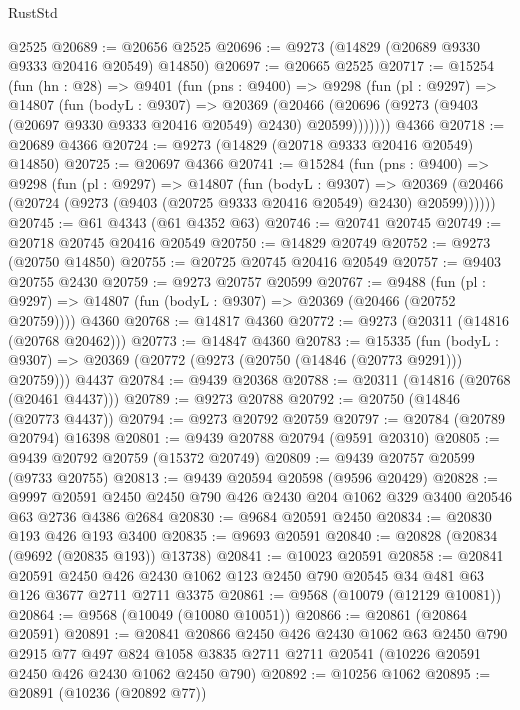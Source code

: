 \begin{lexlean}{RustStd}
\begin{coremodule}
{\begin{coremodule}
{{{{{{{{{{{{{{{{{{{{{{{{{{{{{{{{{{{{{{{{{{{{{{{{{{{{{{{    @2525
@20689 := @20656 @2525
@20696 := @9273 (@14829 (@20689 @9330 @9333 @20416 @20549) @14850)
@20697 := @20665 @2525
@20717 := @15254
    (fun (hn : @28) =>
    @9401
      (fun (pns : @9400) =>
      @9298
        (fun (pl : @9297) =>
        @14807
          (fun (bodyL : @9307) =>
          @20369
            (@20466 (@20696 (@9273 (@9403 (@20697 @9330 @9333 @20416 @20549) @2430) @20599)))))))
    @4366
@20718 := @20689 @4366
@20724 := @9273 (@14829 (@20718 @9333 @20416 @20549) @14850)
@20725 := @20697 @4366
@20741 := @15284
    (fun (pns : @9400) =>
    @9298
      (fun (pl : @9297) =>
      @14807
        (fun (bodyL : @9307) =>
        @20369 (@20466 (@20724 (@9273 (@9403 (@20725 @9333 @20416 @20549) @2430) @20599))))))
@20745 := @61 @4343 (@61 @4352 @63)
@20746 := @20741 @20745
@20749 := @20718 @20745 @20416 @20549
@20750 := @14829 @20749
@20752 := @9273 (@20750 @14850)
@20755 := @20725 @20745 @20416 @20549
@20757 := @9403 @20755 @2430
@20759 := @9273 @20757 @20599
@20767 := @9488
    (fun (pl : @9297) => @14807 (fun (bodyL : @9307) => @20369 (@20466 (@20752 @20759))))
    @4360
@20768 := @14817 @4360
@20772 := @9273 (@20311 (@14816 (@20768 @20462)))
@20773 := @14847 @4360
@20783 := @15335
    (fun (bodyL : @9307) => @20369 (@20772 (@9273 (@20750 (@14846 (@20773 @9291))) @20759)))
    @4437
@20784 := @9439 @20368
@20788 := @20311 (@14816 (@20768 (@20461 @4437)))
@20789 := @9273 @20788
@20792 := @20750 (@14846 (@20773 @4437))
@20794 := @9273 @20792 @20759
@20797 := @20784 (@20789 @20794) @16398
@20801 := @9439 @20788 @20794 (@9591 @20310)
@20805 := @9439 @20792 @20759 (@15372 @20749)
@20809 := @9439 @20757 @20599 (@9733 @20755)
@20813 := @9439 @20594 @20598 (@9596 @20429)
@20828 := @9997
    @20591
    @2450
    @2450
    @790
    @426
    @2430
    @204
    @1062
    @329
    @3400
    @20546
    @63
    @2736
    @4386
    @2684
@20830 := @9684 @20591 @2450
@20834 := @20830 @193 @426 @193 @3400
@20835 := @9693 @20591
@20840 := @20828 (@20834 (@9692 (@20835 @193)) @13738)
@20841 := @10023 @20591
@20858 := @20841
    @20591
    @2450
    @426
    @2430
    @1062
    @123
    @2450
    @790
    @20545
    @34
    @481
    @63
    @126
    @3677
    @2711
    @2711
    @3375
@20861 := @9568 (@10079 (@12129 @10081))
@20864 := @9568 (@10049 (@10080 @10051))
@20866 := @20861 (@20864 @20591)
@20891 := @20841
    @20866
    @2450
    @426
    @2430
    @1062
    @63
    @2450
    @790
    @2915
    @77
    @497
    @824
    @1058
    @3835
    @2711
    @2711
    @20541
    (@10226 @20591 @2450 @426 @2430 @1062 @2450 @790)
@20892 := @10256 @1062
@20895 := @20891 (@10236 (@20892 @77))
}}}}}}}}}}}}}}}}}}}}}}}}}}}}}}}}}}}}}}}}}}}}}}}}}}}}}}}
\end{coremodule}}
\end{coremodule}
\end{lexlean}
